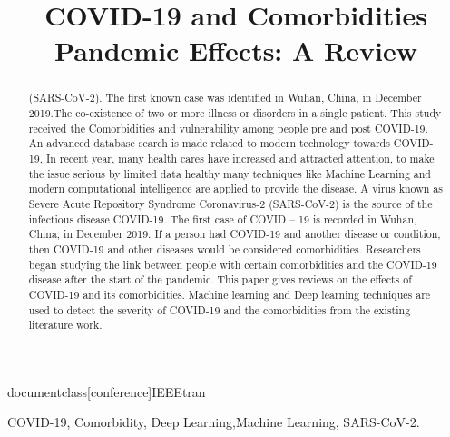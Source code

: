 documentclass[conference]{IEEEtran} 
\IEEEoverridecommandlockouts 
\usepackage{cite} 
\usepackage{url} 
\usepackage{amsmath,amssymb,amsfonts} 
\usepackage{algorithmic} 
\usepackage{graphicx} 
\usepackage{textcomp} 
\usepackage{xcolor} 
\usepackage{stfloats} 
\usepackage{multicol} 
\def\BibTeX{{\rm B\kern-.05em{\sc i\kern-.025em b}\kern-.08em 
T\kern-.1667em\lower.7ex\hbox{E}\kern-.125emX}} 
 
\title{COVID-19 and Comorbidities Pandemic Effects: A Review \\} 
\author{ 
} 
\maketitle 
\begin{abstract} 
(SARS-CoV-2). The first known case was identified in Wuhan, China, in December 2019.The co-existence of 
two or more illness or disorders in a single patient. This study received the Comorbidities and vulnerability 
among people pre and post COVID-19. An advanced database search is made related to modern technology 
towards COVID-19, In recent year, many health cares have increased and attracted attention, to make the issue 
serious by limited data healthy many techniques like Machine Learning and modern computational intelligence 
are applied to provide the disease. 
A virus known as Severe Acute Repository Syndrome Coronavirus-2 (SARS-CoV-2) is the source of the 
infectious disease COVID-19. The first case of COVID – 19 is recorded in Wuhan, China, in December 2019. If 
a person had COVID-19 and another disease or condition, then COVID-19 and other diseases would be 
considered comorbidities. Researchers began studying the link between people with certain comorbidities and 
the COVID-19 disease after the start of the pandemic. This paper gives reviews on the effects of COVID-19 and 
its comorbidities. Machine learning and Deep learning techniques are used to detect the severity of COVID-19 
and the comorbidities from the existing literature work. 
\end{abstract} 
\begin{IEEEkeywords} 
COVID-19, Comorbidity, Deep Learning,Machine Learning, SARS-CoV-2. 
\end{IEEEkeywords} 
